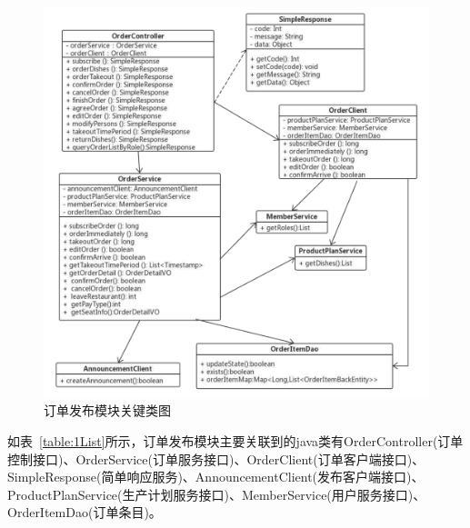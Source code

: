 \begin{figure}[htbp!]
    \centering
    \includegraphics[width=\linewidth]{FIGs/chapter4/order.pdf}
    \caption{订单发布模块关键类图}\label{fig_order}
\end{figure}

如表~\ref{table:1List}所示，订单发布模块主要关联到的java类有OrderController(订单控制接口)、OrderService(订单服务接口)、OrderClient(订单客户端接口)、SimpleResponse(简单响应服务)、AnnouncementClient(发布客户端接口)、ProductPlanService(生产计划服务接口)、MemberService(用户服务接口)、OrderItemDao(订单条目)。\\

